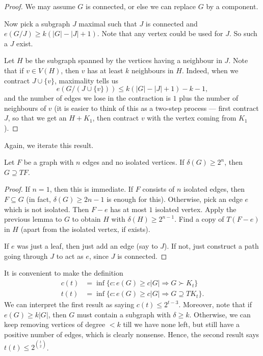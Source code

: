 \documentclass[a4paper]{article}
\begin{document}
\begin{proof}
  We may assume $G$ is connected, or else we can replace $G$ by a component.

  Now pick a subgraph $J$ maximal such that $J$ is connected and $e(G/J) \geq k(|G| - |J| + 1)$. Note that any vertex could be used for $J$. So such a $J$ exist.

  Let $H$ be the subgraph spanned by the vertices having a neighbour in $J$. Note that if $v \in V(H)$, then $v$ has at least $k$ neighbours in $H$. Indeed, when we contract $J \cup \{v\}$, maximality tells us
  \[
    e(G/(J \cup \{v\})) \leq k(|G| - |J| + 1) - k - 1,
  \]
  and the number of edges we lose in the contraction is $1$ plus the number of neighbours of $v$ (it is easier to think of this as a two-step process --- first contract $J$, so that we get an $H + K_1$, then contract $v$ with the vertex coming from $K_1$).
\end{proof}

Again, we iterate this result.
\begin{thm}
  Let $F$ be a graph with $n$ edges and no isolated vertices. If $\delta(G) \geq 2^n$, then $G \supseteq TF$.
\end{thm}

\begin{proof}
  If $n = 1$, then this is immediate. If $F$ consists of $n$ isolated edges, then $F \subseteq G$ (in fact, $\delta(G) \geq 2n - 1$ is enough for this). Otherwise, pick an edge $e$ which is not isolated. Then $F - e$ has at most $1$ isolated vertex. Apply the previous lemma to $G$ to obtain $H$ with $\delta(H) \geq 2^{n - 1}$. Find a copy of $T(F - e)$ in $H$ (apart from the isolated vertex, if exists).

  If $e$ was just a leaf, then just add an edge (say to $J$). If not, just construct a path going through $J$ to act as $e$, since $J$ is connected.
\end{proof}

It is convenient to make the definition
\begin{align*}
  c(t) &= \inf \{c: e(G) \geq c|G| \Rightarrow G \succ K_t\}\\
  t(t) &= \inf \{c: e(G) \geq c|G| \Rightarrow G \supseteq T K_t\}.
\end{align*}
We can interpret the first result as saying $c(t) \leq 2^{t - 3}$. Moreover, note that if $e(G) \geq k|G|$, then $G$ must contain a subgraph with $\delta \geq k$. Otherwise, we can keep removing vertices of degree $<k$ till we have none left, but still have a positive number of edges, which is clearly nonsense. Hence, the second result says $t(t) \leq 2^{\binom{t}{2}}$.
\end{document}
